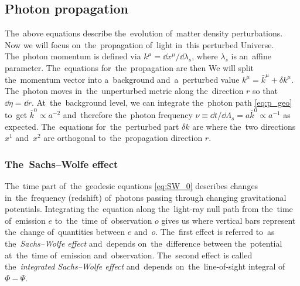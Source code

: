 \subsection{Photon propagation}
The~above equations describe the~evolution of~matter density perturbations. Now we will focus on~the~propagation of~light in~this perturbed Universe. The~photon momentum is defined via $k^\mu=\dd x^\mu/\dd\lambda_s$, where $\lambda_s$ is an~affine parameter. The~equations for~the~propagation are then
We will split the~momentum vector into a~background and~a~perturbed value $k^\mu=\bar k^\mu+\delta k^\mu$. The~photon moves in~the~unperturbed metric along the~direction $r$ so that $\dd\eta=\dd r$. At~the~background level, we can integrate the~photon path \eqref{eq:p_geo} to~get $\bar k^0\propto a^{-2}$ and~therefore the~photon frequency $\nu\equiv\dd t/\dd\Lambda_s=a\bar k^0\propto a^{-1}$ as expected. The~equations for~the~perturbed part $\delta k$ are \parencite[for~details see e.g. ][]{2010deto.book.....A}
where the~two directions $x^1$ and~$x^2$ are orthogonal to~the~propagation direction $r$.
\subsubsection{The~Sachs--Wolfe effect}
The~time part of~the~geodesic equations \eqref{eq:SW_0} describes changes in~the~frequency (redshift) of~photons passing through changing gravitational potentials. Integrating the~equation along the~light-ray null path from the~time of~emission $e$ to~the~time of~observation $o$ gives us
where vertical bars represent the~change of~quantities between $e$ and~$o$. The~first effect is referred to~as the~\textit{Sachs--Wolfe effect} and~depends on~the~difference between the~potential at~the~time of~emission and~observation. The~second effect is called the~\textit{integrated Sachs--Wolfe effect} and~depends on~the~line-of-sight integral of~$\Phi-\Psi$.
